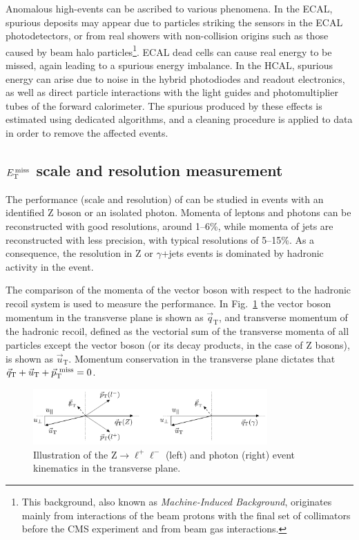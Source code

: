Anomalous high-\MET events can be ascribed to various phenomena. In the ECAL, spurious deposits may appear due to particles striking the sensors in the ECAL photodetectors, or from real showers with non-collision origins such as those caused by beam halo particles\footnote{This background, also known as \emph{Machine-Induced Background}, originates mainly from interactions of the beam protons with the final set of collimators before the CMS experiment and from beam gas interactions.}. ECAL dead cells can cause real energy to be missed, again leading to a spurious energy imbalance. In the HCAL, spurious energy can arise due to noise in the hybrid photodiodes and readout electronics, as well as direct particle interactions with the light guides and photomultiplier tubes of the forward calorimeter. The spurious \MET produced by these effects is estimated using dedicated algorithms, and a cleaning procedure is applied to data in order to remove the affected events.

\subsection[\MET scale and resolution measurement]{\boldmath$E_\mathrm{T}^\mathrm{\,miss}$ scale and resolution measurement}\label{sec:metscale}
The performance (scale and resolution) of \MET can be studied in events with an identified Z boson or an isolated photon. Momenta of leptons and photons can be reconstructed with good resolutions, around 1--6\%, while momenta of jets are reconstructed with less precision, with typical resolutions of 5--15\%. As a consequence, the \MET resolution in Z or $\gamma$+jets events is dominated by hadronic activity in the event.

The comparison of the momenta of the vector boson with respect to the hadronic recoil system is used to measure the \MET performance. In Fig.~\ref{fig:metZgamma} the vector boson momentum in the transverse plane is shown as $\vec{q}_\mathrm{T}$, and transverse momentum of the hadronic recoil, defined as the vectorial sum of the transverse momenta of all particles except the vector boson (or its decay products, in the
case of Z bosons), is shown as $\vec{u}_\mathrm{T}$. Momentum conservation in the transverse plane dictates that $\vec{q}_\mathrm{T} + \vec{u}_\mathrm{T} + \vec{p}_\mathrm{T}^\mathrm{~miss} = 0$.

\begin{figure}[htb]
\centering
\includegraphics[width=0.8\textwidth]{images/metZgamma.pdf}
\caption{Illustration of the $\mathrm{Z\to\ell^+\ell^-}$ (left) and photon (right) event kinematics in the transverse plane.}\label{fig:metZgamma}
\end{figure}

